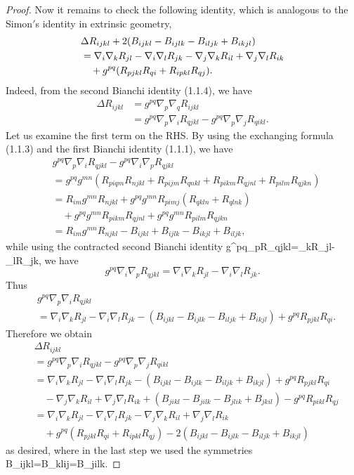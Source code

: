 \begin{proof}
Now it remains to check the following identity, which is analogous
to the Simon$'$s identity in extrinsic geometry,
\begin{align}
& \Delta R_{ijkl}+2(B_{ijkl}-B_{ijlk}-B_{iljk}+B_{ikjl})\\
&  = \nabla_i\nabla_k R_{jl}-\nabla_i\nabla_l
R_{jk}-\nabla_j\nabla_k R_{il}+\nabla_j\nabla_l R_{ik} \nonumber\\
&\quad +g^{pq}(R_{pjkl}R_{qi}+R_{ipkl}R_{qj}). \nonumber
\end{align}
Indeed, from the second Bianchi identity (1.1.4), we have
\begin{align*}
\Delta R_{ijkl}&  = g^{pq}\nabla_p\nabla_q R_{ijkl}\\
&  = g^{pq}\nabla_p\nabla_i
R_{qjkl}-g^{pq}\nabla_p\nabla_jR_{qikl}.
\end{align*}
Let us examine the first term on the RHS. By using the exchanging
formula (1.1.3) and the first Bianchi identity (1.1.1), we have
\begin{align*}
& g^{pq}\nabla_p\nabla_iR_{qjkl}-g^{pq}\nabla_i\nabla_pR_{qjkl}\\
& = g^{pq}g^{mn}(R_{piqm}R_{njkl}+R_{pijm}R_{qnkl}
+R_{pikm}R_{qjnl}+R_{pilm}R_{qjkn})\\
& = R_{im}g^{mn}R_{njkl}+g^{pq}g^{mn}R_{pimj}(R_{qkln}+R_{qlnk})\\
&\quad +g^{pq}g^{mn}R_{pikm}R_{qjnl}+g^{pq}g^{mn}R_{pilm}R_{qjkn}\\
& = R_{im}g^{mn}R_{njkl}-B_{ijkl}+B_{ijlk}-B_{ikjl}+B_{iljk},
\end{align*}
while using the contracted second Bianchi identity \be
g^{pq}\nabla_pR_{qjkl}=\nabla_kR_{jl}-\nabla_lR_{jk},%
\ee we have
$$
g^{pq}\nabla_i\nabla_pR_{qjkl}
=\nabla_i\nabla_kR_{jl}-\nabla_i\nabla_lR_{jk}.
$$
Thus
\begin{align*}
& g^{pq}\nabla_p\nabla_iR_{qjkl} \\
&
=\nabla_i\nabla_kR_{jl}-\nabla_i\nabla_lR_{jk}-(B_{ijkl}-B_{ijlk}
-B_{iljk}+B_{ikjl})+g^{pq}R_{pjkl}R_{qi}.
\end{align*}
Therefore we obtain
\begin{align*}
& \Delta R_{ijkl} \\
&  = g^{pq}\nabla_p\nabla_iR_{qjkl}-g^{pq}\nabla_p\nabla_jR_{qikl}\\
&
=\nabla_i\nabla_kR_{jl}-\nabla_i\nabla_lR_{jk}-(B_{ijkl}-B_{ijlk}
-B_{iljk}+B_{ikjl})+g^{pq}R_{pjkl}R_{qi}\\
&\quad
-\nabla_j\nabla_kR_{il}+\nabla_j\nabla_lR_{ik}+(B_{jikl}-B_{jilk}
-B_{jlik}+B_{jkil})-g^{pq}R_{pikl}R_{qj}\\
& = \nabla_i\nabla_kR_{jl}-\nabla_i\nabla_lR_{jk}
-\nabla_j\nabla_kR_{il}+\nabla_j\nabla_lR_{ik}\\[2mm]
&\quad +g^{pq}(R_{pjkl}R_{qi}+R_{ipkl}R_{qj})-2(B_{ijkl}-B_{ijlk}
-B_{iljk}+B_{ikjl})
\end{align*}
as desired, where in the last step we used the symmetries \be
B_{ijkl}=B_{klij}=B_{jilk}.%
\ee
\end{proof}

